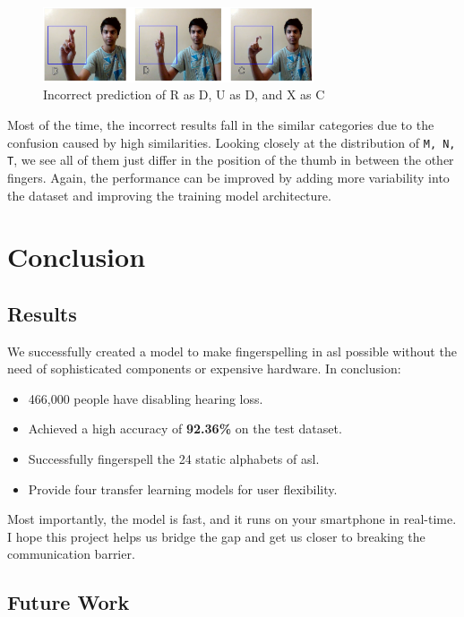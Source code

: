 \documentclass[twocolumn]{article}
\begin{document}
\begin{figure}[h]
\centering
\includegraphics[width=8cm]{./figures/asl ddc}
\caption{Incorrect prediction of R as D, U as D, and X as C}
\label{asl ddc}
\end{figure}

Most of the time, the incorrect results fall in the similar categories due to the confusion caused by high similarities. Looking closely at the distribution of \texttt{{M, N, T}}, we see all of them just differ in the position of the thumb in between the other fingers. Again, the performance can be improved by adding more variability into the dataset and improving the training model architecture.


\section{Conclusion}

\subsection{Results}

We successfully created a model to make fingerspelling in \gls{asl} possible 
without the need of sophisticated components or expensive hardware. In 
conclusion:

\begin{itemize}
	\item 466,000 people have disabling hearing loss.
	\item Achieved a high accuracy of \textbf{92.36\%} on the test dataset.
	\item Successfully fingerspell the 24 static alphabets of \gls{asl}.
	\item Provide four transfer learning models for user flexibility.
\end{itemize}

Most importantly, the model is fast, and it runs on your smartphone in 
real-time. I hope this project helps us bridge the gap and get us closer to 
breaking the communication barrier.

\subsection{Future Work}
\end{document}

